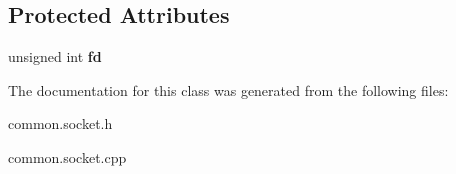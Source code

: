 \subsection*{Protected Attributes}
\begin{DoxyCompactItemize}
\item 
\hypertarget{classSocket_a25dd8cf38a7a8742858f5b3193deeb15}{unsigned int {\bfseries fd}}\label{classSocket_a25dd8cf38a7a8742858f5b3193deeb15}

\end{DoxyCompactItemize}


The documentation for this class was generated from the following files\-:\begin{DoxyCompactItemize}
\item 
common.\-socket.\-h\item 
common.\-socket.\-cpp\end{DoxyCompactItemize}
